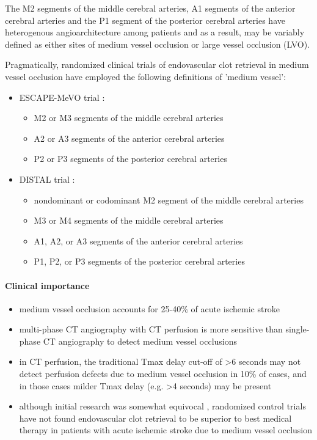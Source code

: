 The M2 segments of the middle cerebral arteries, A1 segments of the anterior cerebral arteries and the P1 segment of the posterior cerebral arteries have heterogenous angioarchitecture among patients and as a result, may be variably defined as either sites of medium vessel occlusion or large vessel occlusion (LVO).

Pragmatically, randomized clinical trials of endovascular clot retrieval in medium vessel occlusion have employed the following definitions of 'medium vessel':

\begin{itemize}
	\item
	ESCAPE-MeVO trial :
	
	\begin{itemize}
		\item
		M2 or M3 segments of the middle cerebral arteries
		\item
		A2 or A3 segments of the anterior cerebral arteries
		\item
		P2 or P3 segments of the posterior cerebral arteries
	\end{itemize}
	\item
	DISTAL trial :
	
	\begin{itemize}
		\item
		nondominant or codominant M2 segment of the middle cerebral arteries
		\item
		M3 or M4 segments of the middle cerebral arteries
		\item
		A1, A2, or A3 segments of the anterior cerebral arteries
		\item
		P1, P2, or P3 segments of the posterior cerebral arteries
	\end{itemize}
\end{itemize}


\paragraph{Clinical importance}

\begin{itemize}
	\item
	medium vessel occlusion accounts for 25-40\% of acute ischemic stroke 
	\item
	multi-phase CT angiography with CT perfusion is more sensitive than single-phase CT angiography to detect medium vessel occlusions 
	\item
	in CT perfusion, the traditional Tmax delay cut-off of \textgreater6 seconds may not detect perfusion defects due to medium vessel occlusion in 10\% of cases, and in those cases milder Tmax delay (e.g. \textgreater4 seconds) may be present 
	\item
	although initial research was somewhat equivocal , randomized control trials have not found endovascular clot retrieval to be superior to best medical therapy in patients with acute ischemic stroke due to medium vessel occlusion 
\end{itemize}


